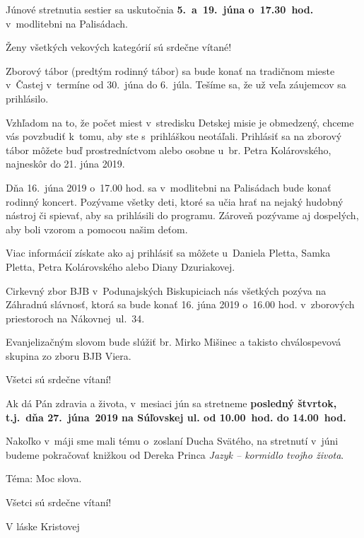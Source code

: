 Júnové stretnutia sestier sa uskutočnia  {\bf 5.~a~19.~júna o~17.30~hod.} v~modlitebni na Palisádach.

Ženy všetkých vekových kategórií sú srdečne vítané!
\vskip5pt


Zborový tábor (predtým rodinný tábor) sa bude konať na tradičnom mieste v~Častej v~termíne od 30.~júna do 6.~júla. Tešíme sa, že už veľa záujemcov sa prihlásilo.

Vzhľadom na to, že počet miest v~stredisku Detskej misie je obmedzený, chceme vás povzbudiť k~tomu, aby ste s~prihláškou neotáľali. Prihlásiť sa na zborový tábor môžete buď prostredníctvom  alebo osobne u~br. Petra Kolárovského, najneskôr do 21. júna 2019.


Dňa 16.~júna 2019 o~17.00 hod. sa v~modlitebni na Palisádach bude konať rodinný koncert. Pozývame všetky deti, ktoré sa učia hrať na nejaký hudobný nástroj či spievať, aby sa prihlásili do programu. Zároveň pozývame aj dospelých, aby boli vzorom a pomocou našim deťom.

Viac informácií získate ako aj prihlásiť sa môžete u~Daniela Pletta, Samka Pletta, Petra Kolárovského alebo Diany Dzuriakovej.


Cirkevný zbor BJB v~Podunajských Biskupiciach nás všetkých pozýva na Záhradnú slávnosť, ktorá sa bude konať 16. júna 2019 o~16.00 hod. v~zborových priestoroch na Nákovnej~ul.~34.

Evanjelizačným slovom bude slúžiť br. Mirko Mišinec a takisto chválospevová skupina zo zboru BJB Viera.

Všetci sú srdečne vítaní!


Ak dá Pán zdravia a života, v~mesiaci jún sa stretneme {\bf posledný štvrtok, t.j.~dňa 27.~júna~2019 na Súľovskej ul. od 10.00~hod. do 14.00~hod.}

Nakoľko v~máji sme mali tému o~zoslaní Ducha Svätého, na stretnutí v~júni budeme pokračovať knižkou od Dereka Princa {\it Jazyk -- kormidlo tvojho života}.

Téma: Moc slova.

Všetci sú srdečne vítaní!

V láske Kristovej

\vfill\break


